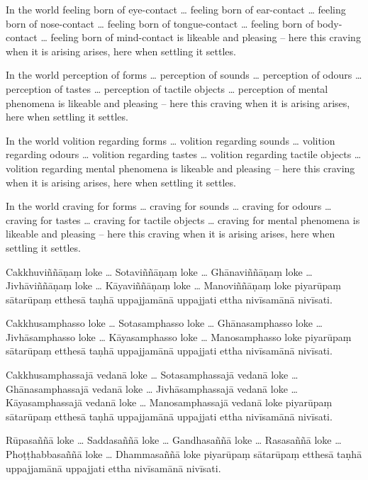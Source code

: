 In the world feeling born of eye-contact \ldots{} feeling born of ear-contact
\ldots{} feeling born of nose-contact \ldots{} feeling born of tongue-contact
\ldots{} feeling born of body-contact \ldots{} feeling born of mind-contact is
likeable and pleasing -- here this craving when it is arising arises, here when
settling it settles.

In the world perception of forms \ldots{} perception of sounds \ldots{}
perception of odours \ldots{} perception of tastes \ldots{} perception of
tactile objects \ldots{} perception of mental phenomena is likeable and pleasing
-- here this craving when it is arising arises, here when settling it settles.

In the world volition regarding forms \ldots{} volition regarding sounds
\ldots{} volition regarding odours \ldots{} volition regarding tastes \ldots{}
volition regarding tactile objects \ldots{} volition regarding mental phenomena
is likeable and pleasing -- here this craving when it is arising arises, here
when settling it settles.

In the world craving for forms \ldots{} craving for sounds \ldots{} craving for
odours \ldots{} craving for tastes \ldots{} craving for tactile objects \ldots{}
craving for mental phenomena is likeable and pleasing -- here this craving when
it is arising arises, here when settling it settles.

\paliPage

Cakkhuviññāṇaṃ loke \ldots{} Sotaviññāṇaṃ loke \ldots{} Ghānaviññāṇaṃ loke
\ldots{} Jivhāviññāṇaṃ loke \ldots{} Kāyaviññāṇaṃ loke \ldots{} Manoviññāṇaṃ
loke piyarūpaṃ sātarūpaṃ etthesā taṇhā uppajjamānā uppajjati ettha nivīsamānā
nivīsati.

Cakkhusamphasso loke \ldots{} Sotasamphasso loke \ldots{} Ghānasamphasso loke
\ldots{} Jivhāsamphasso loke \ldots{} Kāyasamphasso loke \ldots{} Manosamphasso
loke piyarūpaṃ sātarūpaṃ etthesā taṇhā uppajjamānā uppajjati ettha nivīsamānā
nivīsati.

Cakkhusamphassajā vedanā loke \ldots{} Sotasamphassajā vedanā loke \ldots{}
Ghānasamphassajā vedanā loke \ldots{} Jivhāsamphassajā vedanā loke \ldots{}
Kāyasamphassajā vedanā loke \ldots{} Manosamphassajā vedanā loke piyarūpaṃ
sātarūpaṃ etthesā taṇhā uppajjamānā uppajjati ettha nivīsamānā nivīsati.

Rūpasaññā loke \ldots{} Saddasaññā loke \ldots{} Gandhasaññā loke \ldots{}
Rasasaññā loke \ldots{} Phoṭṭhabbasaññā loke \ldots{} Dhammasaññā loke piyarūpaṃ
sātarūpaṃ etthesā taṇhā uppajjamānā uppajjati ettha nivīsamānā nivīsati.

